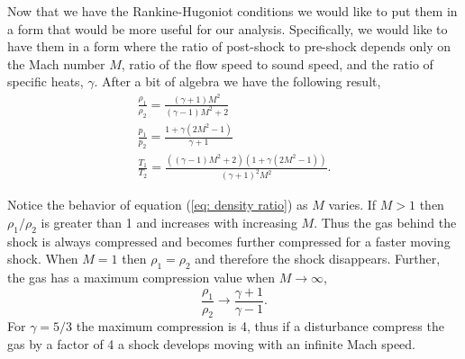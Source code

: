 \documentclass{article}
\begin{document}
Now that we have the Rankine-Hugoniot conditions we would like to put them in a form that would be more useful for our analysis. Specifically, we would like to have them in a form where the ratio of post-shock to pre-shock depends only on the Mach number $M$, ratio of the flow speed to sound speed, and the ratio of specific heats, $\gamma$. After a bit of algebra we have the following result,
\begin{gather}
\label{eq: density ratio}
\frac{\rho_1}{\rho_2}  = \frac{\left(\gamma+1\right)M^2}{\left(\gamma-1\right)M^2+2}\\
\label{eq: momentum ratio}
\frac{p_1}{p_2} = \frac{1+\gamma\left(2 M^2-1\right)}{\gamma+1}\\
\label{eq: temperature ratio}
\frac{T_1}{T_2} = \frac{\left(\left(\gamma-1\right)M^2+2\right)\left(1+\gamma\left(2M^2-1\right)\right)}{\left(\gamma+1\right)^2M^2}.
\end{gather}

Notice the behavior of equation (\ref{eq: density ratio}) as $M$ varies. If $M >1$ then $\rho_1/\rho_2$ is greater than 1 and increases with increasing $M$. Thus the gas behind the shock is always compressed and becomes further compressed for a faster moving shock. When $M = 1$ then $\rho_1 = \rho_2$ and therefore the shock disappears. Further, the gas has a maximum compression value when $M\rightarrow\infty$,
\begin{equation}
\label{eq: density ratio limit}
\frac{\rho_1}{\rho_2} \rightarrow \frac{\gamma + 1}{\gamma - 1}.
\end{equation}
For $\gamma = 5/3$ the maximum compression is 4, thus if a disturbance compress the gas by a factor of 4 a shock develops moving with an infinite Mach speed.
\end{document}
